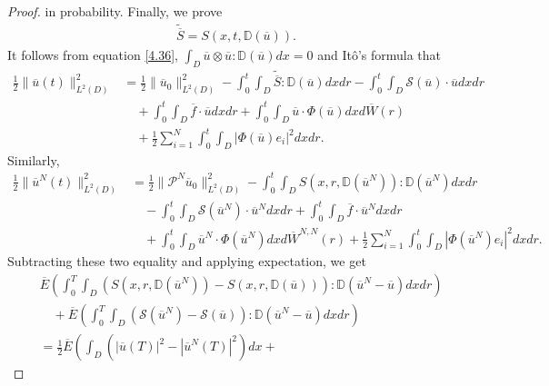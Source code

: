 \documentclass[reqno]{amsart}
\theoremstyle{definition}
\theoremstyle{remark}
\numberwithin{equation}{section} \allowdisplaybreaks
\begin{document}
\begin{proof}
in probability. Finally, we prove
\begin{equation}\label{4.37}
\begin{split}
\tilde{\overline{S}}=S(x,t,\mathbb{D}(\overline{u})).
\end{split}
\end{equation}
It follows from equation \eqref{4.36}, $\int_{D}\overline{u}\otimes
\overline{u}: \mathbb{D}(\overline{u})dx=0$ and It\^{o}'s formula
that
\begin{equation*}
\begin{split}
\frac{1}{2}\|\overline{u}(t)\|^2_{L^2(D)}
&=\frac{1}{2}\|\overline{u}_0\|^2_{L^2(D)}-\int_0^t\!\!\!\int_D\tilde{\overline{S}}:\mathbb{D}(\overline{u})dxdr-\int_0^t\!\!\!\int_D
\mathcal{S}(\overline{u})\cdot \overline{u}dxdr\\
&\quad+\int_0^t\!\!\!\int_D\overline{f}\cdot
\overline{u}dxdr+\int_0^t\!\!\!\int_D
\overline{u}\cdot \Phi(\overline{u}) dxd\overline{W}(r)\\
&\quad+{\frac{1}{2}\sum_{i=1}^N\int_0^t\!\!\!\int_D|\Phi(\overline{u})e_i|^2dxdr}.
\end{split}
\end{equation*} Similarly,
\begin{equation*}
\begin{split}
\frac{1}{2}\|\overline{u}^N(t)\|^2_{L^2(D)}
&=\frac{1}{2}\|\mathcal{P}^N\overline{u}_0\|^2_{L^2(D)}-\int_0^t\!\!\!\int_DS(x,r,\mathbb{D}(\overline{u}^N)):\mathbb{D}(\overline{u}^N)dxdr\\
&\quad-\int_0^t\!\!\!\int_D \mathcal{S}(\overline{u}^N)\cdot
\overline{u}^Ndxdr+\int_0^t\!\!\!\int_D\overline{f}\cdot
\overline{u}^Ndxdr\\
&\quad+\int_0^t\!\!\!\int_D \overline{u}^N\cdot
\Phi(\overline{u}^N)dxd\overline{W}^{N,N}(r)
+{\frac{1}{2}\sum_{i=1}^N\int_0^t\!\!\!\int_D|\Phi(\overline{u}^N)e_i|^2dxdr}.
\end{split}
\end{equation*}
Subtracting these two equality and applying expectation,
we get
\begin{align*}
&\overline{E}\left(\int_0^T\!\!\!\int_D\!\left(S(x,r,\mathbb{D}(\overline{u}^N))-S(x,r,\mathbb{D}(\overline{u}))\right):
\mathbb{D}(\overline{u}^N-\overline{u})dxdr\right)\\
&\quad+\overline{E}\left(\int_0^T\!\!\!\int_D\left(\mathcal{S}(\overline{u}^N)-\mathcal{S}(\overline{u})\right):\mathbb{D}(\overline{u}^N-\overline{u})dxdr\right)\\
&=\frac{1}{2}\overline{E}\left(\int_D\left(|\overline{u}(T)|^2-|\overline{u}^N(T)|^2\right)dx+

\end{align*}
\end{proof}
\end{document}
